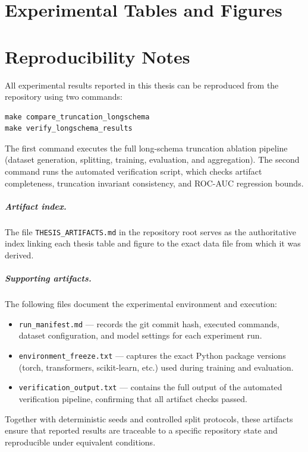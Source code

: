 \documentclass[
  english,
  accentcolor=9c,
  ruledheaders=section,
  class=report,
  thesis={type=bachelor},
  fontsize=11pt,
  parskip=half-,
  custommargins=true,
  marginpar=false,
  accept-missing-logos=true, %
]{tudapub}
\begin{document}
\chapter{Experimental Tables and Figures}
\label{sec:tables_and_figures}


\chapter{Reproducibility Notes}
\label{sec:reproducibility_notes}

All experimental results reported in this thesis can be reproduced from the
repository using two commands:

\begin{verbatim}
make compare_truncation_longschema
make verify_longschema_results
\end{verbatim}

The first command executes the full long-schema truncation ablation pipeline
(dataset generation, splitting, training, evaluation, and aggregation). The
second command runs the automated verification script, which checks artifact
completeness, truncation invariant consistency, and ROC-AUC regression bounds.

\paragraph{Artifact index.}
The file \texttt{THESIS\_ARTIFACTS.md} in the repository root serves as the
authoritative index linking each thesis table and figure to the exact data
file from which it was derived.

\paragraph{Supporting artifacts.}
The following files document the experimental environment and execution:

\begin{itemize}
    \item \texttt{run\_manifest.md} --- records the git commit hash, executed
          commands, dataset configuration, and model settings for each
          experiment run.
    \item \texttt{environment\_freeze.txt} --- captures the exact Python
          package versions (torch, transformers, scikit-learn, etc.) used
          during training and evaluation.
    \item \texttt{verification\_output.txt} --- contains the full output of
          the automated verification pipeline, confirming that all artifact
          checks passed.
\end{itemize}

Together with deterministic seeds and controlled split protocols, these
artifacts ensure that reported results are traceable to a specific repository
state and reproducible under equivalent conditions.

\printbibliography
\end{document}
